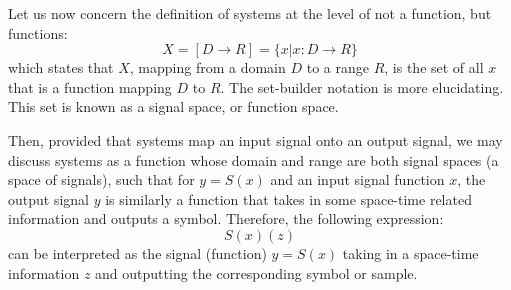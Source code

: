 Let us now concern the definition of systems at the level of not a function, but functions:
\[
    X = [D \rightarrow R] = \{x | x: D \rightarrow R\}
\]
which states that $X$, mapping from a domain $D$ to a range $R$, is the set of all $x$ that is a function mapping $D$ to $R$.
The set-builder notation is more elucidating. This set is known as a signal space, or function space.

Then, provided that systems map an input signal onto an output signal, we may discuss systems as a function whose domain and range are both signal spaces (a space of signals), such that for $y = S(x)$ and an input signal function $x$, the output signal $y$ is similarly a function that takes in some space-time related information and outputs a symbol.
Therefore, the following expression:
\[
    S(x)(z)
\]
can be interpreted as the signal (function) $y = S(x)$ taking in a space-time information $z$ and outputting the corresponding symbol or sample.

